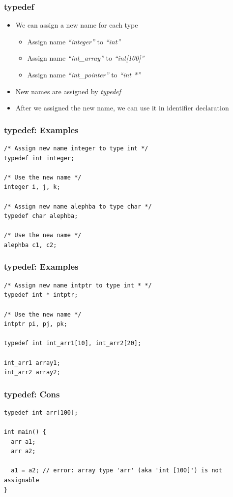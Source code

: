 \documentclass{../c-lecture}
\begin{document}
\begin{frame}
  \frametitle{typedef}
  \begin{itemize}
    \item We can assign a new name for each type
    \begin{itemize}
      \item
        Assign name \textit{\color{LimeGreen} ``integer''} to
        \textit{\color{YellowOrange} ``int''}
      \item
        Assign name \textit{\color{LimeGreen} ``int\_array''} to
        \textit{\color{YellowOrange} ``int[100]''}
      \item
        Assign name \textit{\color{LimeGreen} ``int\_pointer''} to
        \textit{\color{YellowOrange} ``int *''}

    \end{itemize}
    \item New names are assigned by \textit{\color{Purple} typedef}
    \item
      After we assigned the new name, we can use it in identifier declaration

  \end{itemize}
\end{frame}

\begin{frame}[fragile]
  \frametitle{typedef: Examples}
  \scriptsize
  \begin{verbatim}
/* Assign new name integer to type int */
typedef int integer;

/* Use the new name */
integer i, j, k;

/* Assign new name alephba to type char */
typedef char alephba;

/* Use the new name */
alephba c1, c2;
  \end{verbatim}
\end{frame}

\begin{frame}[fragile]
  \frametitle{typedef: Examples}
  \begin{verbatim}
/* Assign new name intptr to type int * */
typedef int * intptr;

/* Use the new name */
intptr pi, pj, pk;

typedef int int_arr1[10], int_arr2[20];

int_arr1 array1;
int_arr2 array2;
  \end{verbatim}
\end{frame}

\begin{frame}[fragile]
  \frametitle{typedef: Cons}
  \begin{verbatim}
typedef int arr[100];

int main() {
  arr a1;
  arr a2;

  a1 = a2; // error: array type 'arr' (aka 'int [100]') is not assignable
}
  \end{verbatim}
\end{frame}
\end{document}
